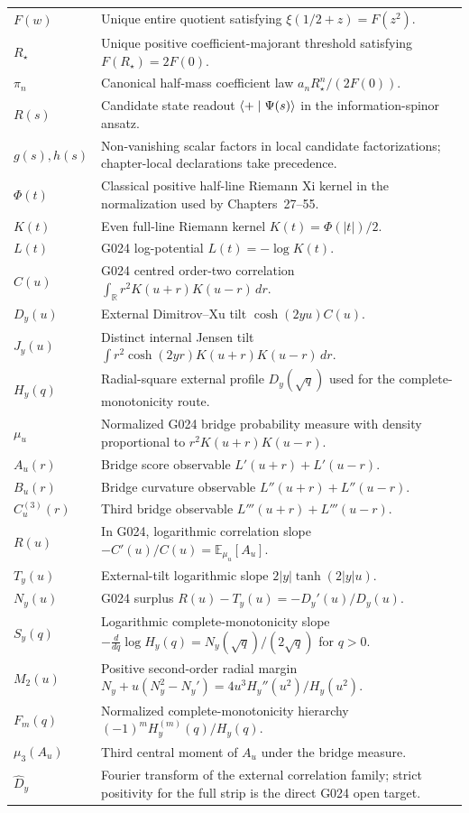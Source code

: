 \begin{longtable}{p{}p{}}
$F(w)$ & Unique entire quotient satisfying $\xi(1/2+z)=F(z^2)$.\\
$R_\star$ & Unique positive coefficient-majorant threshold satisfying $F(R_\star)=2F(0)$.\\
$\pi_n$ & Canonical half-mass coefficient law $a_nR_\star^n/(2F(0))$.\\
$R(s)$ & Candidate state readout $\langle +\mid \Psi(s)\rangle$ in the information-spinor ansatz.\\
$g(s),h(s)$ & Non-vanishing scalar factors in local candidate factorizations; chapter-local declarations take precedence.\\
$\Phi(t)$ & Classical positive half-line Riemann Xi kernel in the normalization used by Chapters~27--55.\\
$K(t)$ & Even full-line Riemann kernel $K(t)=\Phi(|t|)/2$.\\
$L(t)$ & G024 log-potential $L(t)=-\log K(t)$.\\
$C(u)$ & G024 centred order-two correlation $\int_{\mathbb R}r^2K(u+r)K(u-r)\,dr$.\\
$D_y(u)$ & External Dimitrov--Xu tilt $\cosh(2yu)C(u)$.\\
$J_y(u)$ & Distinct internal Jensen tilt $\int r^2\cosh(2yr)K(u+r)K(u-r)\,dr$.\\
$H_y(q)$ & Radial-square external profile $D_y(\sqrt q)$ used for the complete-monotonicity route.\\
$\mu_u$ & Normalized G024 bridge probability measure with density proportional to $r^2K(u+r)K(u-r)$.\\
$A_u(r)$ & Bridge score observable $L'(u+r)+L'(u-r)$.\\
$B_u(r)$ & Bridge curvature observable $L''(u+r)+L''(u-r)$.\\
$C_u^{(3)}(r)$ & Third bridge observable $L'''(u+r)+L'''(u-r)$.\\
$R(u)$ & In G024, logarithmic correlation slope $-C'(u)/C(u)=\mathbb E_{\mu_u}[A_u]$.\\
$T_y(u)$ & External-tilt logarithmic slope $2|y|\tanh(2|y|u)$.\\
$N_y(u)$ & G024 surplus $R(u)-T_y(u)=-D_y'(u)/D_y(u)$.\\
$S_y(q)$ & Logarithmic complete-monotonicity slope $-\frac{d}{dq}\log H_y(q)=N_y(\sqrt q)/(2\sqrt q)$ for $q>0$.\\
$M_2(u)$ & Positive second-order radial margin $N_y+u(N_y^2-N_y')=4u^3H_y''(u^2)/H_y(u^2)$.\\
$F_m(q)$ & Normalized complete-monotonicity hierarchy $(-1)^mH_y^{(m)}(q)/H_y(q)$.\\
$\mu_3(A_u)$ & Third central moment of $A_u$ under the bridge measure.\\
$\widehat D_y$ & Fourier transform of the external correlation family; strict positivity for the full strip is the direct G024 open target.\\
\bottomrule
\end{longtable}


